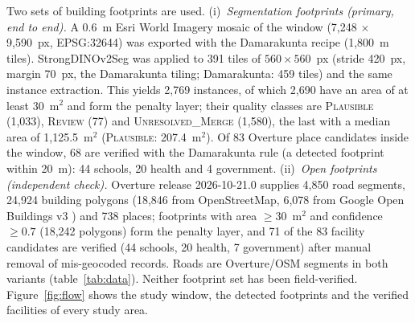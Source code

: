 \documentclass[12pt,a4paper]{article}
\newcommand{\dinoseg}{StrongDINOv2Seg}
\begin{document}
Two sets of building footprints are used. (i)~\emph{Segmentation footprints (primary, end to end).} A 0.6~m Esri World Imagery mosaic of the window (7{,}248 $\times$ 9{,}590~px, EPSG:32644) was exported with the Damarakunta recipe (1{,}800~m tiles). \dinoseg{} was applied to 391 tiles of $560\times560$~px (stride 420~px, margin 70~px, the Damarakunta tiling; Damarakunta: 459 tiles) and the same instance extraction. This yields 2{,}769 instances, of which 2{,}690 have an area of at least 30~m$^2$ and form the penalty layer; their quality classes are \textsc{Plausible} (1{,}033), \textsc{Review} (77) and \textsc{Unresolved\_Merge} (1{,}580), the last with a median area of 1{,}125.5~m$^2$ (\textsc{Plausible}: 207.4~m$^2$). Of 83 Overture place candidates inside the window, 68 are verified with the Damarakunta rule (a detected footprint within 20~m): 44 schools, 20 health and 4 government. (ii)~\emph{Open footprints (independent check).} Overture release 2026-10-21.0 \cite{overture2026} supplies 4{,}850 road segments, 24{,}924 building polygons (18{,}846 from OpenStreetMap, 6{,}078 from Google Open Buildings v3 \cite{sirko2021openbuildings}) and 738 places; footprints with area $\ge 30$~m$^2$ and confidence $\ge 0.7$ (18{,}242 polygons) form the penalty layer, and 71 of the 83 facility candidates are verified (44 schools, 20 health, 7 government) after manual removal of mis-geocoded records. Roads are Overture/OSM segments in both variants (table~\ref{tab:data}). Neither footprint set has been field-verified. Figure~\ref{fig:flow} shows the study window, the detected footprints and the verified facilities of every study area.
\end{document}
